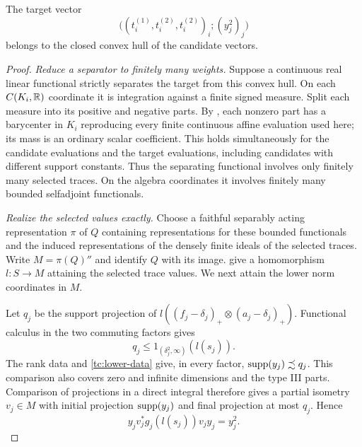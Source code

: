 \begin{proposition}\label{tc:finite-convexity}
The target vector
\begin{equation}\label{tc:target-vector}
 \bigl((t_i^{(1)},t_i^{(2)},t_i^{(2)})_i;(y_j^2)_j\bigr)
\end{equation}
belongs to the closed convex hull of the candidate vectors.
\end{proposition}

\begin{proof}
\smallskip\noindent\emph{Reduce a separator to finitely many weights.} 
Suppose a continuous real linear functional strictly separates the
target from this convex hull.  On each $C(K_i,\mathbb R)$ coordinate it is
integration against a finite signed measure.  Split each measure into
its positive and negative parts.  By , each nonzero
part has a barycenter in $K_i$ reproducing every finite continuous
affine evaluation used here; its mass is an ordinary scalar
coefficient.  This holds simultaneously for the candidate evaluations
and the target evaluations, including candidates with different
support constants.  Thus the separating functional involves only
finitely many selected traces.  On the algebra coordinates it involves
finitely many bounded selfadjoint functionals.

\smallskip\noindent\emph{Realize the selected values exactly.} 
Choose a faithful separably acting representation $\pi$ of $Q$
containing representations for these bounded functionals and the
induced representations of the densely finite ideals of the selected
traces.  Write $M=\pi(Q)''$ and identify $Q$ with its image.
 give a
homomorphism $l:S\to M$ attaining the selected trace values.  We next
attain the lower norm coordinates in $M$.

Let $q_j$ be the support projection of
$l((f_j-\delta_j)_+\otimes(a_j-\delta_j)_+)$.  Functional calculus in
the two commuting factors gives
\[
 q_j\leq1_{(\delta_j^2,\infty)}(l(s_j)).
\]
The rank data and \eqref{tc:lower-data} give, in every factor,
$\operatorname{supp}(y_j)\precsim q_j$.  This comparison also covers zero and
infinite dimensions and the type III parts.  Comparison of projections
in a direct integral therefore gives a partial isometry $v_j\in M$
with initial projection $\operatorname{supp}(y_j)$ and final projection at most
$q_j$.  Hence
\begin{equation}\label{tc:exact-norm-signal}
 y_jv_j^*g_j(l(s_j))v_jy_j=y_j^2.
\end{equation}


\end{proof}
